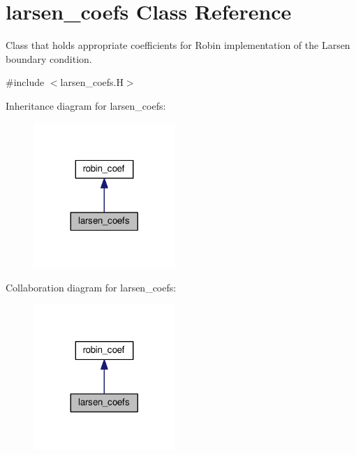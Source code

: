 \hypertarget{classlarsen__coefs}{}\section{larsen\+\_\+coefs Class Reference}
\label{classlarsen__coefs}


Class that holds appropriate coefficients for Robin implementation of the Larsen boundary condition.  




{\ttfamily \#include $<$larsen\+\_\+coefs.\+H$>$}



Inheritance diagram for larsen\+\_\+coefs\+:\nopagebreak
\begin{figure}[H]
\begin{center}
\leavevmode
\includegraphics[width=152pt]{classlarsen__coefs__inherit__graph}
\end{center}
\end{figure}


Collaboration diagram for larsen\+\_\+coefs\+:\nopagebreak
\begin{figure}[H]
\begin{center}
\leavevmode
\includegraphics[width=152pt]{classlarsen__coefs__coll__graph}
\end{center}
\end{figure}
